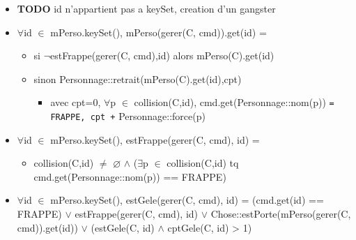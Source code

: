 \documentclass[11pt]{article}
\begin{document}
\begin{itemize}

\item \textbf{TODO} id n'appartient pas a keySet, creation d'un gangster\\
\label{sec-1.7.3.1}


\item $\forall$id $\in$ mPerso.keySet(), mPerso(gerer(C, cmd)).get(id) =\\
\label{sec-1.7.3.2}

\begin{itemize}

\item si $\neg$estFrappe(gerer(C, cmd),id) alors mPerso(C).get(id)\\
\label{sec-1.7.3.2.1}


\item sinon Personnage::retrait(mPerso(C).get(id),cpt)\\
\label{sec-1.7.3.2.2}

\begin{itemize}

\item avec cpt=0, $\forall$p $\in$ collision(C,id), cmd.get(Personnage::nom(p)) \texttt{= FRAPPE, cpt +} Personnage::force(p)\\
\label{sec-1.7.3.2.2.1}


\end{itemize} %
\end{itemize} %

\item $\forall$id $\in$ mPerso.keySet(), estFrappe(gerer(C, cmd), id) =\\
\label{sec-1.7.3.3}

\begin{itemize}

\item collision(C,id) $\neq$ $\varnothing$ $\wedge$ ($\exists$p $\in$ collision(C,id) tq cmd.get(Personnage::nom(p)) == FRAPPE)\\
\label{sec-1.7.3.3.1}


\end{itemize} %

\item $\forall$id $\in$ mPerso.keySet(), estGele(gerer(C, cmd), id) = (cmd.get(id) == FRAPPE) $\vee$ estFrappe(gerer(C, cmd), id) $\vee$ Chose::estPorte(mPerso(gerer(C, cmd)).get(id)) $\vee$ (estGele(C, id) $\wedge$ cptGele(C, id) > 1)\\
\label{sec-1.7.3.4}




\end{itemize}
\end{document}
